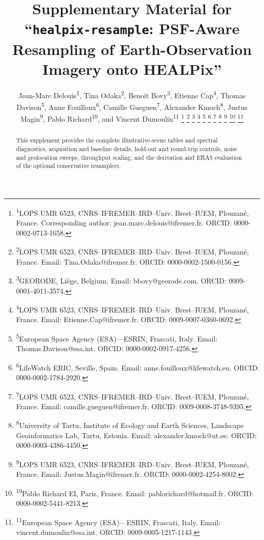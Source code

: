 \documentclass[journal]{IEEEtran}
\begin{document}
\title{Supplementary Material for ``\texttt{healpix-resample}: PSF-Aware Resampling of Earth-Observation Imagery onto HEALPix''}

\author{
Jean-Marc Delouis\textsuperscript{1},
Tina Odaka\textsuperscript{2},
Benoit Bovy\textsuperscript{3},
Etienne Cap\textsuperscript{4},
Thomas Davison\textsuperscript{5},
Anne Fouilloux\textsuperscript{6},
Camille Gueguen\textsuperscript{7},
Alexander Kmoch\textsuperscript{8},
Justus Magin\textsuperscript{9},
Pablo Richard\textsuperscript{10},
and Vincent Dumoulin\textsuperscript{11}%
\thanks{\textsuperscript{1}LOPS UMR 6523,
CNRS--IFREMER--IRD--Univ. Brest--IUEM, Plouzané, France.
Corresponding author: jean.marc.delouis@ifremer.fr. ORCID: 0000-0002-0713-1658.}%
\thanks{\textsuperscript{2}LOPS UMR 6523,
CNRS--IFREMER--IRD--Univ. Brest--IUEM, Plouzané, France.
Email: Tina.Odaka@ifremer.fr. ORCID: 0000-0002-1500-0156.}%
\thanks{\textsuperscript{3}GEORODE, Liège, Belgium.
Email: bbovy@georode.com. ORCID: 0009-0001-4011-3574.}%
\thanks{\textsuperscript{4}LOPS UMR 6523,
CNRS--IFREMER--IRD--Univ. Brest--IUEM, Plouzané, France.
Email: Etienne.Cap@ifremer.fr. ORCID: 0009-0007-0360-0692.}%
\thanks{\textsuperscript{5}European Space Agency (ESA)---ESRIN, Frascati, Italy.
Email: Thomas.Davison@esa.int. ORCID: 0000-0002-0917-4256.}%
\thanks{\textsuperscript{6}LifeWatch ERIC, Seville, Spain.
Email: anne.fouilloux@lifewatch.eu. ORCID: 0000-0002-1784-2920.}%
\thanks{\textsuperscript{7}LOPS UMR 6523,
CNRS--IFREMER--IRD--Univ. Brest--IUEM, Plouzané, France.
Email: camille.gueguen@ifremer.fr. ORCID: 0009-0008-3748-9395.}%
\thanks{\textsuperscript{8}University of Tartu,
Institute of Ecology and Earth Sciences,
Landscape Geoinformatics Lab, Tartu, Estonia.
Email: alexander.kmoch@ut.ee. ORCID: 0000-0003-4386-4450.}%
\thanks{\textsuperscript{9}LOPS UMR 6523,
CNRS--IFREMER--IRD--Univ. Brest--IUEM, Plouzané, France.
Email: Justus.Magin@ifremer.fr. ORCID: 0000-0002-4254-8002.}%
\thanks{\textsuperscript{10}Pablo Richard EI, Paris, France.
Email: pablorichard@hotmail.fr. ORCID: 0000-0002-5441-8213.}%
\thanks{\textsuperscript{11}European Space Agency (ESA)---ESRIN, Frascati, Italy.
Email: vincent.dumoulin@esa.int. ORCID: 0009-0005-1217-1143.}%
}

\maketitle

\begin{abstract}
This supplement provides the complete illustrative-scene tables and spectral
diagnostics, acquisition and baseline details, hold-out and round-trip
controls, noise and geolocation sweeps, throughput scaling, and the derivation
and ERA5 evaluation of the optional conservative resamplers.
\end{abstract}
\end{document}
